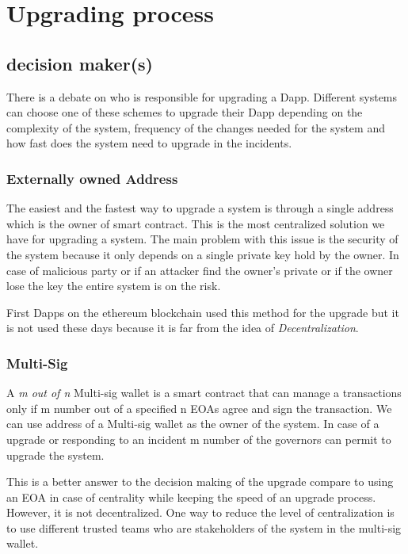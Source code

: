  

 \section{Upgrading process}


 \subsection{decision maker(s)}
 There is a debate on who is responsible for upgrading a Dapp. Different systems can choose one of these schemes to upgrade their Dapp depending on the complexity of the system, frequency of the changes needed for the system and how fast does the system need to upgrade in the incidents.
 \subsubsection{Externally owned Address}
The easiest and the fastest way to upgrade a system is through a single address which is the owner of smart contract. This is the most centralized solution we have for upgrading a system. The main problem with this issue is the security of the system because it only depends on a single private key hold by the owner. In case of malicious party or if an attacker find the owner's private or if the owner lose the key the entire system is on the risk.

First Dapps on the ethereum blockchain used this method for the upgrade but it is not used these days because it is far from the idea of \textit{Decentralization}. 

 \subsubsection{Multi-Sig}
 A \textit{m out of n} Multi-sig wallet is a smart contract that can manage a transactions only if m number out of a specified n EOAs agree and sign the transaction. We can use address of a Multi-sig wallet as the owner of the system. In case of a upgrade or responding to an incident m number of the governors can permit to upgrade the system.

 This is a better answer to the decision making of the upgrade compare to using an EOA in case of centrality while keeping the speed of an upgrade process. However, it is not decentralized. One way to reduce the level of centralization is to use different trusted teams who are stakeholders of the system in the multi-sig wallet. 


